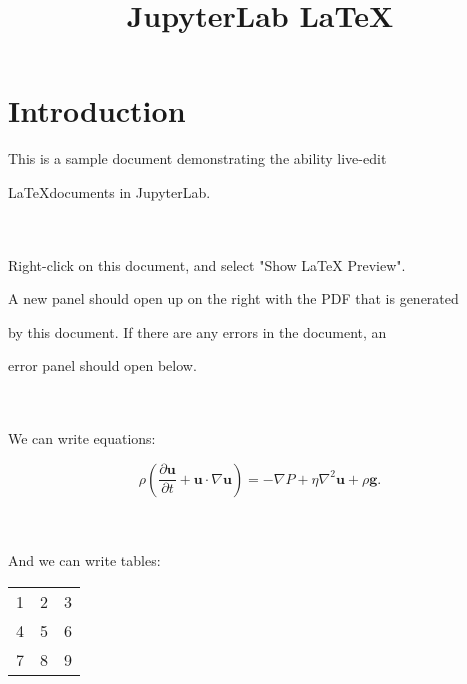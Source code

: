 \documentclass{article}
\begin{document}
\title{JupyterLab \LaTeX}

\date{}

\maketitle




\section{Introduction}

This is a sample document demonstrating the ability live-edit

\LaTeX documents in JupyterLab.

\\

\\

Right-click on this document, and select "Show LaTeX Preview".

A new panel should open up on the right with the PDF that is generated

by this document. If there are any errors in the document, an

error panel should open below.

\\

\\

We can write equations:

\begin{equation}

    \rho \left( \frac{\partial \mathbf{u}}{\partial t} + \mathbf{u} \cdot \nabla \mathbf{u} \right) =

    -\nabla P + \eta \nabla^2 \mathbf{u} + \rho \mathbf{g}.

\end{equation}

\\

\\

And we can write tables:

\begin{center}

  \begin{tabular}{ | l | c | r| }

    \hline

    1 & 2 & 3 \\ 

    4 & 5 & 6 \\ 

    7 & 8 & 9 \\

    \hline

  \end{tabular}

\end{center}
\end{document}
